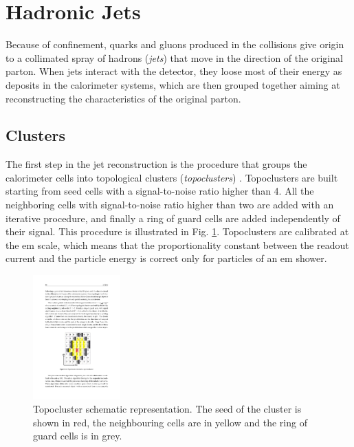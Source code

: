 \section{Hadronic Jets}

Because of confinement, quarks and gluons produced in the collisions give origin to a collimated spray of hadrons (\textit{jets}) that move in the direction of the original parton. When jets interact with the detector, they loose most of their energy as deposits in the calorimeter systems, which are then grouped together aiming at reconstructing the characteristics of the original parton. 

\subsection{Clusters}
The first step in the jet reconstruction is the procedure that groups the calorimeter cells into topological clusters (\textit{topoclusters}) \cite{Lampl:2008zz,Aad:2016upy}. Topoclusters are built starting from seed cells with a signal-to-noise ratio higher than 4. All the neighboring cells with signal-to-noise ratio higher than two are added with an iterative procedure, and finally a ring of guard cells are added independently of their signal. This procedure is illustrated in Fig. \ref{fig:obj:topocluster}. Topoclusters are calibrated at the \gls{em} scale, which means that the proportionality constant between the readout current and the particle energy is correct only for particles of an \gls{em} shower.

\begin{figure}[h]
\begin{center}
\includegraphics[width=0.3\textwidth]{./figures/objects/topocluster.pdf}
\end{center}
\caption[Topocluster schematic representation]{Topocluster schematic representation. The seed of the cluster is shown in red, the neighbouring cells are in yellow and the ring of guard cells is in grey.}
\label{fig:obj:topocluster}
\end{figure}
 
